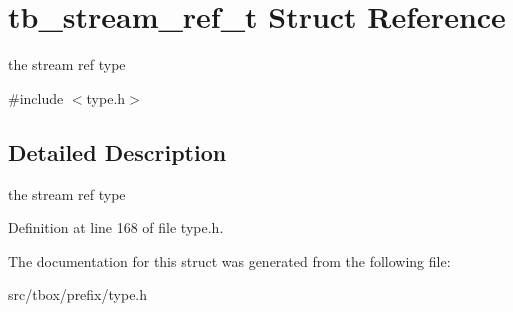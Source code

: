 \hypertarget{structtb__stream__ref__t}{\section{tb\-\_\-stream\-\_\-ref\-\_\-t Struct Reference}
\label{structtb__stream__ref__t}
}


the stream ref type  




{\ttfamily \#include $<$type.\-h$>$}



\subsection{Detailed Description}
the stream ref type 

Definition at line 168 of file type.\-h.



The documentation for this struct was generated from the following file\-:\begin{DoxyCompactItemize}
\item 
src/tbox/prefix/type.\-h\end{DoxyCompactItemize}
